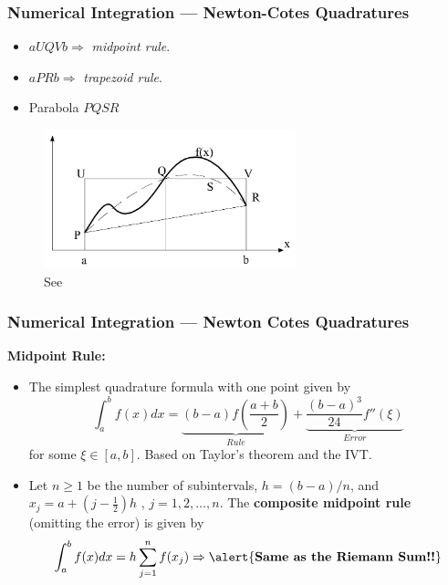 \documentclass[11pt,xcolor={svgnames},aspectratio=169,usepdftitle=false]{beamer}
\begin{document}
\begin{frame}
  \frametitle{Numerical Integration --- Newton-Cotes Quadratures}
  \begin{minipage}{0.3\textwidth}
  \begin{itemize}
    \item $aUQVb\Rightarrow$ \textit{midpoint rule}.
    \item $aPRb\Rightarrow$ \textit{trapezoid rule}.
    \item Parabola $PQSR$
  \end{itemize}
\end{minipage}
\begin{minipage}{0.69\textwidth}
  \begin{figure}
    \centering
    \includegraphics[width = 0.65\textwidth]{../figures/judd_newton_cotes.png}
    \caption{See \cite{judd1998numerical}}
  \end{figure}
\end{minipage}
\end{frame}

\begin{frame}
  \frametitle{Numerical Integration --- Newton Cotes Quadratures}
\alert{\textbf{Midpoint Rule:}}
\begin{itemize}
  \item The simplest quadrature formula with one point given by
  \[
  \int^b_a f(x)dx = \underset{Rule}{\underbrace{(b-a)f\left(\frac{a+b}{2}\right)}} + \underset{Error}{\underbrace{\frac{(b-a)^3}{24}f''(\xi)}}
  \]
  for some $\xi\in [a,b]$. Based on Taylor's theorem and the IVT.
  \item Let $n\geq 1$ be the number of subintervals, $h = (b -a) / n$, and $x_j = a + (j - \frac{1}{2})h$ , $j=1,2,\ldots,n$. The \alert{\textbf{composite midpoint rule}} {\tiny (omitting the error)} is given by
  \[
  \int^b_a f(x)dx = h\sum^n_{j=1}f(x_j) \Rightarrow \text{\alert{\textbf{Same as the Riemann Sum!!}}}
  \]
\end{itemize}
\end{frame}
\end{document}
